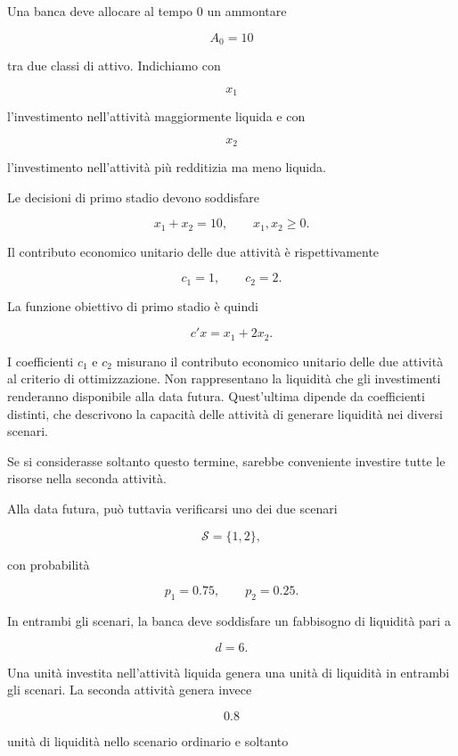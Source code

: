 \begin{example}

Una banca deve allocare al tempo $0$ un ammontare

\[
A_0=10
\]

\noindent tra due classi di attivo. Indichiamo con

\[
x_1
\]

\noindent l'investimento nell'attivit\`a maggiormente liquida e con

\[
x_2
\]

\noindent l'investimento nell'attivit\`a pi\`u redditizia ma meno liquida.

Le decisioni di primo stadio devono soddisfare

\[
x_1+x_2=10,
\qquad
x_1,x_2\geq0.
\]

Il contributo economico unitario delle due attivit\`a \`e rispettivamente

\[
c_1=1,
\qquad
c_2=2.
\]

La funzione obiettivo di primo stadio \`e quindi

\[
c'x=x_1+2x_2.
\]

\noindent
I coefficienti $c_1$ e $c_2$ misurano il contributo
economico unitario delle due attivit\`{a} al criterio
di ottimizzazione. Non rappresentano la liquidit\`{a}
che gli investimenti renderanno disponibile alla data
futura. Quest'ultima dipende da coefficienti distinti,
che descrivono la capacit\`{a} delle attivit\`{a} di
generare liquidit\`{a} nei diversi scenari.


Se si considerasse soltanto questo termine, sarebbe conveniente investire
tutte le risorse nella seconda attivit\`a.

Alla data futura, pu\`o tuttavia verificarsi uno dei due scenari

\[
\mathcal S=\{1,2\},
\]

\noindent con probabilit\`a

\[
p_1=0.75,
\qquad
p_2=0.25.
\]

In entrambi gli scenari, la banca deve soddisfare un fabbisogno di
liquidit\`a pari a

\[
d=6.
\]

Una unit\`a investita nell'attivit\`a liquida genera una unit\`a di
liquidit\`a in entrambi gli scenari. La seconda attivit\`a genera invece

\[
0.8
\]

\noindent unit\`a di liquidit\`a nello scenario ordinario e soltanto


\end{example}
